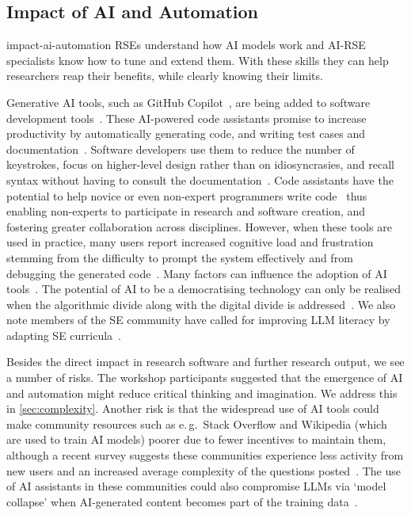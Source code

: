 \documentclass{eceasst}
\newcommand{\eg}{e.\,g.}
\begin{document}
\subsection{Impact of AI and Automation}
\label{sec:ai}
\begin{whatis}{}{impact-ai-automation}
RSEs understand how AI models work and AI-RSE specialists know how to tune and extend them.
With these skills they can help researchers reap their benefits,
while clearly knowing their limits.
\end{whatis}
Generative AI tools, such as GitHub Copilot~\cite{Friedmann2021},
are being added to software development tools~\cite{Alenezi2025}.
These AI-powered code assistants promise to increase productivity
by automatically generating code, and writing test cases and documentation~\cite{Banh2025}.
Software developers use them to reduce the number of keystrokes,
focus on higher-level design rather than on idiosyncrasies,
and recall syntax without having to consult the documentation~\cite{Liang2024}.
Code assistants have the potential to help novice or even non-expert programmers
write code~\cite{Feldman2024} thus enabling non-experts to participate in research
and software creation, and fostering greater collaboration across disciplines.
However, when these tools are used in practice, many users report increased cognitive
load and frustration stemming from the difficulty to prompt the system effectively
and from debugging the generated code~\cite{Simkute2025}.
Many factors can influence the adoption of AI tools~\cite{Russo2024}.
The potential of AI to be a democratising technology can only be realised
when the algorithmic divide along with the digital divide is addressed~\cite{Yu2020}.
We also note members of the SE community have called for improving LLM literacy
by adapting SE curricula~\cite{Kirova2024}.

Besides the direct impact in research software and further research output,
we see a number of risks.
The workshop participants suggested that the emergence of AI and automation might reduce critical thinking and imagination.
We address this in \autoref{sec:complexity}.
Another risk is that the widespread use of AI tools could make community resources
such as \eg\ Stack Overflow and Wikipedia (which are used to train AI models) poorer
due to fewer incentives to maintain them, although a recent survey suggests
these communities experience less activity from new users and an increased
average complexity of the questions posted~\cite{Burtch2024}.
The use of AI assistants in these communities could also compromise LLMs via `model collapse'
when AI-generated content becomes part of the training data~\cite{Shumailov2024}.
\end{document}
